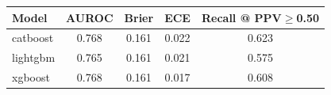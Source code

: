 \begin{tabular}{@{}lcccc@{}}
\toprule
Model & AUROC & Brier & ECE & Recall @ PPV$\geq$0.50\\
\midrule
catboost & 0.768 & 0.161 & 0.022 & 0.623\\
lightgbm & 0.765 & 0.161 & 0.021 & 0.575\\
xgboost & 0.768 & 0.161 & 0.017 & 0.608\\
\bottomrule
\end{tabular}
